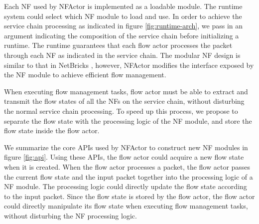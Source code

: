 Each NF used by NFActor is implemented as a loadable module. The runtime system could select which NF module to load and use. In order to achieve the service chain processing as indicated in figure \ref{fig:runtime-arch}, we pass in an argument indicating the composition of the service chain before initializing a runtime. The runtime guarantees that each flow actor processes the packet through each NF as indicated in the service chain. The modular NF design is similar to that in NetBricks \cite{199352}, however, NFActor modifies the interface exposed by the NF module to achieve efficient flow management.


When executing flow management tasks, flow actor must be able to extract and transmit the flow states of all the NFs on the service chain, without disturbing the normal service chain processing. To speed up this process, we propose to separate the flow state with the processing logic of the NF module, and store the flow state inside the flow actor.

We summarize the core APIs used by NFActor to construct new NF modules in figure \ref{fig:api}. Using these APIs, the flow actor could acquire a new flow state when it is created. When the flow actor processes a packet, the flow actor passes the current flow state and the input packet together into the processing logic of a NF module. The processing logic could directly update the flow state according to the input packet. Since the flow state is stored by the flow actor, the flow actor could directly manipulate its flow state when executing flow management tasks, without disturbing the NF processing logic.


